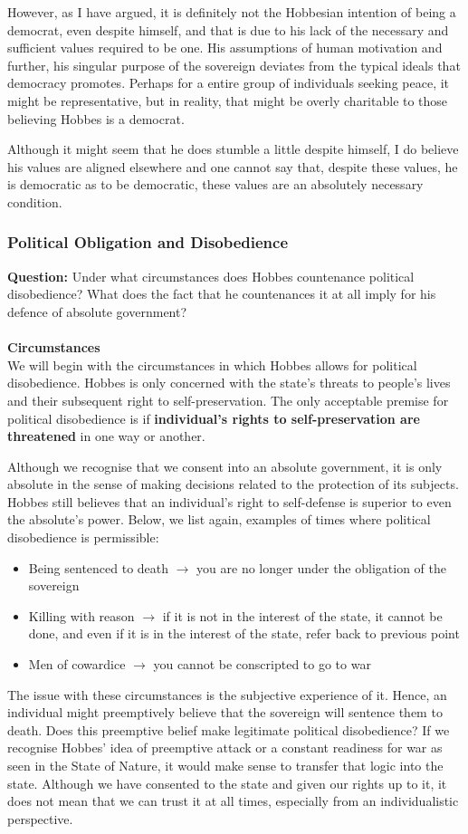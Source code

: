 \documentclass[12pt, letterpaper]{article}
\begin{document}
However, as I have argued, it is definitely not the Hobbesian intention of being a democrat, even despite himself, and that is due to his lack of the necessary and sufficient values required to be one. His assumptions of human motivation and further, his singular purpose of the sovereign deviates from the typical ideals that democracy promotes. Perhaps for a entire group of individuals seeking peace, it might be representative, but in reality, that might be overly charitable to those believing Hobbes is a democrat.

Although it might seem that he does stumble a little despite himself, I do believe his values are aligned elsewhere and one cannot say that, despite these values, he is democratic as to be democratic, these values are an absolutely necessary condition.

\subsubsection{Political Obligation and Disobedience}
\textbf{Question:} Under what circumstances does Hobbes countenance political disobedience? What does the fact that he countenances it at all imply for his defence of absolute government?\\\\
\textbf{Circumstances}\\
We will begin with the circumstances in which Hobbes allows for political disobedience. Hobbes is only concerned with the state's threats to people's lives and their subsequent right to self-preservation. The only acceptable premise for political disobedience is if \textbf{individual's rights to self-preservation are threatened} in one way or another.

Although we recognise that we consent into an absolute government, it is only absolute in the sense of making decisions related to the protection of its subjects. Hobbes still believes that an individual's right to self-defense is superior to even the absolute's power. Below, we list again, examples of times where political disobedience is permissible:
\begin{itemize}
	\item Being sentenced to death $\rightarrow$ you are no longer under the obligation of the sovereign
	\item Killing with reason $\rightarrow$ if it is not in the interest of the state, it cannot be done, and even if it is in the interest of the state, refer back to previous point
	\item Men of cowardice $\rightarrow$ you cannot be conscripted to go to war
\end{itemize}
The issue with these circumstances is the subjective experience of it. Hence, an individual might preemptively believe that the sovereign will sentence them to death. Does this preemptive belief make legitimate political disobedience? If we recognise Hobbes' idea of preemptive attack or a constant readiness for war as seen in the State of Nature, it would make sense to transfer that logic into the state. Although we have consented to the state and given our rights up to it, it does not mean that we can trust it at all times, especially from an individualistic perspective.
\end{document}
